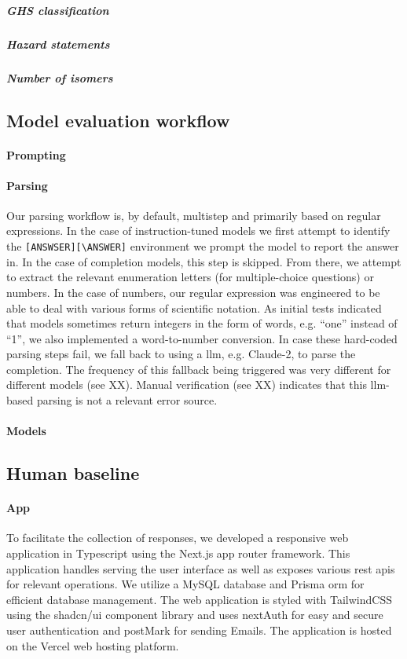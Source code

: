 \documentclass[11pt, oneside]{article}
\begin{document}
\subparagraph{GHS classification}

\subparagraph{Hazard statements}

\subparagraph{Number of isomers}


\subsection{Model evaluation workflow}

\paragraph{Prompting}

\paragraph{Parsing}
Our parsing workflow is, by default, multistep and primarily based on regular expressions. In the case of instruction-tuned models we first attempt to identify the \texttt{[ANSWSER][\textbackslash ANSWER]} environment we prompt the model to report the answer in. In the case of completion models, this step is skipped. From there, we attempt to extract the relevant enumeration letters (for multiple-choice questions) or numbers. In the case of numbers, our regular expression was engineered to be able to deal with various forms of scientific notation. As initial tests indicated that models sometimes return integers in the form of words, e.g. \enquote{one} instead of \enquote{1}, we also implemented a word-to-number conversion. In case these hard-coded parsing steps fail, we fall back to using a \gls{llm}, e.g. Claude-2, to parse the completion. The frequency of this fallback being triggered was very different for different models (see XX). Manual verification (see XX) indicates that this \gls{llm}-based parsing is not a relevant error source.

\paragraph{Models}


\subsection{Human baseline}

\paragraph{App} To facilitate the collection of responses, we developed a responsive web application in Typescript using the Next.js\cite{nextjs} app router framework. 
This application handles serving the user interface as well as exposes various \gls{rest} \glspl{api} for relevant operations. 
We utilize a MySQL database and Prisma \gls{orm} for efficient database management. 
The web application is styled with TailwindCSS using the shadcn/ui component library and uses nextAuth for easy and secure user authentication and postMark for sending Emails.
 The application is hosted on the Vercel web hosting platform. 
\end{document}
